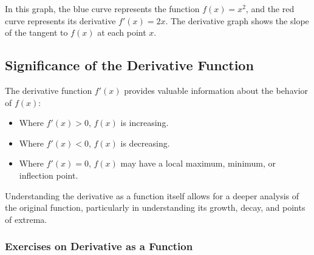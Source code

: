 \documentclass[a4paper,12pt]{book}
\newcounter{example}
\begin{document}

\begin{center}
\end{center}

In this graph, the blue curve represents the function \( f(x) = x^2 \), and the red curve represents its derivative \( f'(x) = 2x \). The derivative graph shows the slope of the tangent to \( f(x) \) at each point \( x \).

\subsection{Significance of the Derivative Function}
The derivative function \( f'(x) \) provides valuable information about the behavior of \( f(x) \):

\begin{itemize}
    \item Where \( f'(x) > 0 \), \( f(x) \) is increasing.
    \item Where \( f'(x) < 0 \), \( f(x) \) is decreasing.
    \item Where \( f'(x) = 0 \), \( f(x) \) may have a local maximum, minimum, or inflection point.
\end{itemize}

Understanding the derivative as a function itself allows for a deeper analysis of the original function, particularly in understanding its growth, decay, and points of extrema.

\subsubsection*{Exercises on Derivative as a Function}
\end{document}
